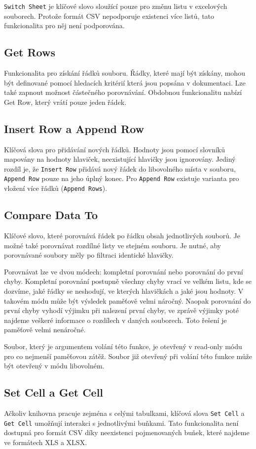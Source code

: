 \texttt{Switch Sheet} je klíčové slovo sloužící pouze pro změnu listu v excelových souborech. Protože formát CSV nepodporuje existenci více listů, tato funkcionalita pro něj není podporována.

\subsection{Get Rows}
Funkcionalita pro získání řádků souboru. Řádky, které mají být získány, mohou být definované pomocí hledacích kritérií která jsou popsána v dokumentaci. Lze také zapnout možnost částečného porovnávání. Obdobnou funkcionalitu nabízí Get Row, který vrátí pouze jeden řádek.

\subsection{Insert Row a Append Row}
Klíčová slova pro přidávání nových řádků. Hodnoty jsou pomocí slovníků mapovány na hodnoty hlaviček, neexistující hlavičky jsou ignorovány. Jediný rozdíl je, že \texttt{Insert Row} přidává nový řádek do libovolného místa v souboru, \texttt{Append Row} pouze na jeho úplný konec. Pro \texttt{Append Row} existuje varianta pro vložení více řádků (\texttt{Append Rows}).

\subsection{Compare Data To}
Klíčové slovo, které porovnává řádek po řádku obsah jednotlivých souborů. Je možné také porovnávat rozdílné listy ve stejném souboru. Je nutné, aby porovnávané soubory měly po filtraci identické hlavičky.

Porovnávat lze ve dvou módech: kompletní porovnání nebo porovnání do první chyby. Kompletní porovnání postupně všechny chyby vrací ve velkém listu, kde se dozvíme, jaké řádky se neshodují, ve kterých hlavičkách a jaké jsou hodnoty. V takovém módu může být výsledek paměťově velmi náročný. Naopak porovnání do první chyby vyhodí výjimku při nalezení první chyby, ve zprávě výjimky poté najdeme veškeré informace o rozdílech v daných souborech. Toto řešení je paměťově velmi nenáročné.

Soubor, který je argumentem volání této funkce, je otevřený v read-only módu pro co nejmenší paměťovou zátěž. Soubor již otevřený při volání této funkce může být otevřený v módu libovolném.

\subsection{Set Cell a Get Cell}
Ačkoliv knihovna pracuje zejména s celými tabulkami, klíčová slova \texttt{Set Cell} a \texttt{Get Cell} umožňují interakci s jednotlivými buňkami. Tato funkcionalita není dostupná pro formát CSV díky neexistenci pojmenovaných buňek, které najdeme ve formátech XLS a XLSX.

